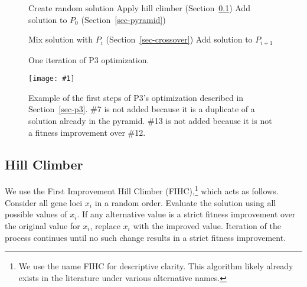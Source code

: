 \documentclass{sig-alternate}
\newcommand{\includegraphicsfit}[1]
{\texttt{[image: \#1]}}
\begin{document}
\begin{figure}
  \begin{algorithmic}
    \State Create random solution
    \State Apply hill climber (Section~\ref{sec-hillclimber})
      \State Add solution to $P_0$ (Section~\ref{sec-pyramid})
    \EndIf

      \State Mix solution with $P_i$ (Section~\ref{sec-crossover})
          \State Add solution to $P_{i+1}$
        \EndIf
      \EndIf
    \EndFor
  \EndProcedure
\end{algorithmic}
  \caption{One iteration of P3 optimization.}
  \label{fig:psuedo}
\end{figure}


\begin{figure}
  \centering
  \includegraphicsfit{P3_big_fail}
  \caption{Example of the first steps of P3's optimization described in Section~\ref{sec-p3}.
  \#7 is not added because it is a duplicate of a solution already in the pyramid.  \#13 is
  not added because it is not a fitness improvement over \#12.}
  \label{fig-p3}
\end{figure}

\subsection{Hill Climber}
\label{sec-hillclimber}

We use the First Improvement Hill Climber
(FIHC),\footnote{We use the name FIHC for descriptive clarity.  This algorithm
  likely already exists in the literature under various alternative names.} which acts as follows.
Consider all gene loci
$x_i$ in a random order.  Evaluate the solution using all possible
values of $x_i$. If any alternative value is a strict fitness improvement
over the original value for $x_i$, replace $x_i$ with the improved
value.  Iteration of the process continues until no such change results in
a strict fitness improvement.
\end{document}
